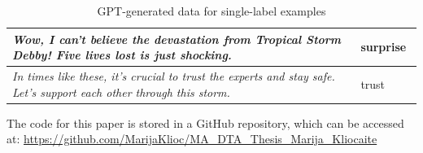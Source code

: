 \documentclass[manuscript]{clv3}
\begin{document}
\begin{table} [hbt!]
\begin{tabular}{|>{\centering\arraybackslash}p{0.85\linewidth}|>{\centering\arraybackslash}p{0.15\linewidth}|}
 \textit{Wow, I can't believe the devastation from Tropical Storm Debby! Five lives lost is just shocking.}&surprise\\\hline
 \textit{In times like these, it's crucial to trust the experts and stay safe. Let's support each other through this storm.}&trust\\\hline
    \end{tabular}
    \caption{GPT-generated data for single-label examples}
    \label{tab:single_examples}
\end{table}

 \label{repo}
 The code for this paper is stored in a GitHub repository, which can be accessed at:
\href{https://github.com/MarijaKlioc/MA_DTA_Thesis_Marija_Kliocaite}{https://github.com/MarijaKlioc/MA\_DTA\_Thesis\_Marija\_Kliocaite}

\starttwocolumn

\end{document}
